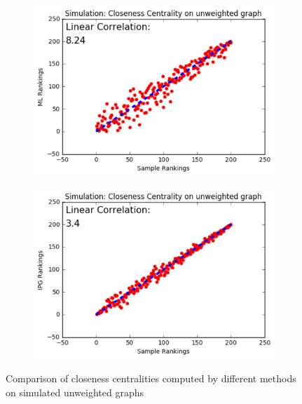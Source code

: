 \documentclass[10pt]{beamer}
\begin{document}
\begin{frame}
\begin{figure}[H]
\begin{subfigure}{.32\textwidth}
    \includegraphics[width=0.95\linewidth]{CCU_ML.jpeg}
\end{subfigure}
\begin{subfigure}{.32\textwidth}
	\centering
    \includegraphics[width=0.95\linewidth]{CCU_IPG.jpeg}
\end{subfigure}
\caption{Comparison of closeness centralities computed by different methods on simulated unweighted graphs}
\end{figure}
\end{frame}
\end{document}
